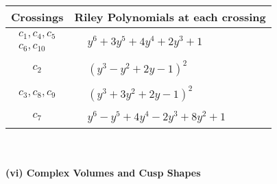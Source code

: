 \documentclass[1p]{elsarticle_modified}
\theoremstyle{definition}
\begin{document}
\begin{tabular}{m{50pt}|m{274pt}}
Crossings & \hspace{64pt}Riley Polynomials at each crossing \\
\hline $$\begin{aligned}c_{1},c_{4},c_{5}\\c_{6},c_{10}\end{aligned}$$&$\begin{aligned}
&y^6+3 y^5+4 y^4+2 y^3+1
\end{aligned}$\\
\hline $$\begin{aligned}c_{2}\end{aligned}$$&$\begin{aligned}
&(y^3- y^2+2 y-1)^2
\end{aligned}$\\
\hline $$\begin{aligned}c_{3},c_{8},c_{9}\end{aligned}$$&$\begin{aligned}
&(y^3+3 y^2+2 y-1)^2
\end{aligned}$\\
\hline $$\begin{aligned}c_{7}\end{aligned}$$&$\begin{aligned}
&y^6- y^5+4 y^4-2 y^3+8 y^2+1
\end{aligned}$\\
\hline
\end{tabular}\\~\\
\newpage\flushleft \textbf{(vi) Complex Volumes and Cusp Shapes}
\end{document}
